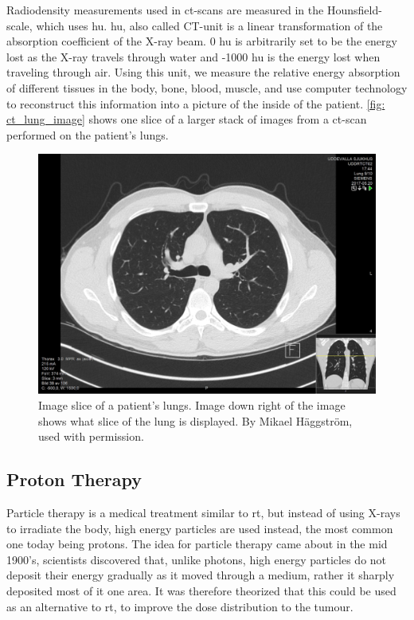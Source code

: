 \documentclass[main.tex]{subfiles}
\begin{document}
Radiodensity measurements used in \gls{ct}-scans are measured in the Hounsfield-scale, which uses \gls{hu}. \gls{hu}, also called CT-unit is a linear transformation of the absorption coefficient of the X-ray beam. 0 \gls{hu} is arbitrarily set to be the energy lost as the X-ray travels through water and -1000 \gls{hu} is the energy lost when traveling through air. Using this unit, we measure the relative energy absorption of different tissues in the body, bone, blood, muscle, and use computer technology to reconstruct this information into a picture of the inside of the patient. \autoref{fig: ct_lung_image} shows one slice of a larger stack of images from a \gls{ct}-scan performed on the patient's lungs.


 \begin{figure}[!htpb]
    \centering
    \includegraphics[width=12cm ]{images/High-resolution_computed_tomograph_of_a_normal_thorax,_axial_plane_(38).jpg}
    \caption{Image slice of a patient's lungs. Image down right of the image shows what slice of the lung is displayed. By Mikael Häggström, used with permission.}
    \label{fig: ct_lung_image}
\end{figure}
\FloatBarrier 


\subsection{Proton Therapy}

Particle therapy is a medical treatment similar to \gls{rt}, but instead of using X-rays to irradiate the body, high energy particles are used instead, the most common one today being protons. The idea for particle therapy came about in the mid 1900's, scientists discovered that, unlike photons, high energy particles do not deposit their energy gradually as it moved through a medium, rather it sharply deposited most of it one area. It was therefore theorized that this could be used as an alternative to \gls{rt}, to improve the dose distribution to the tumour. 
\end{document}
